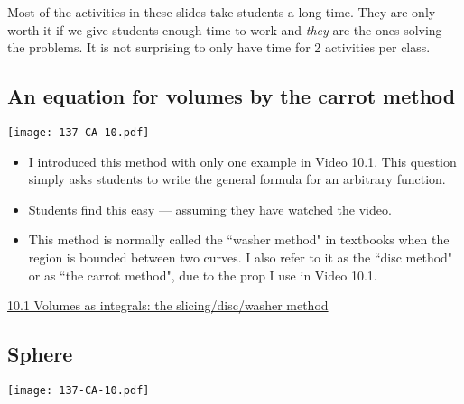 \documentclass[11pt]{article}
\newcommand{\nl}{\hfill \vspace{-1.1\baselineskip}} %
\newcommand{\vi}{\hspace{8mm}\href{https://www.youtube.com/watch?v=Kq9Q5LISo5o&list=PLlwePzQY_wW9f22c89JAQBzaa-9XgESA8}{10.1 Volumes as integrals: the slicing/disc/washer method}}
\begin{document}
\vspace{5mm}

\begin{warning}
Most of the activities in these slides take students a long time.    They are only worth it if we give students enough time to work and \emph{they} are the ones solving the problems.  It is not surprising to only have time for 2 activities per class.
\end{warning}

\tableofcontents

\newpage

\subsection{An equation for volumes by the carrot method}

\begin{center}
{ \texttt{[image: 137-CA-10.pdf]}} 
\end{center}

\begin{comments}
\nl
	\begin{itemize}
		\item  I introduced this method with only one example in Video 10.1.  This question simply asks students to write the general formula for an arbitrary function.
		\item Students find this easy --- assuming they have watched the video.
		\item  This method is normally called the ``washer method" in textbooks when the region is bounded between two curves.  I also refer to it as the ``disc method" or as ``the carrot method", due to the prop I use in Video 10.1.
	\end{itemize}
\end{comments}

\begin{videos}
\vi
\end{videos}

\newpage
\subsection{Sphere}

\begin{center}
{ \texttt{[image: 137-CA-10.pdf]}} 
\end{center}
\end{document}
